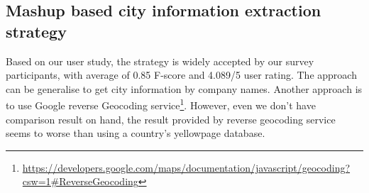 \subsection{Mashup based city information extraction strategy}

Based on our user study, the strategy is widely accepted by our survey participants, with average of 0.85 F-score and 4.089/5 user rating. The approach can be generalise to get city information by company names. Another approach is to use Google reverse Geocoding service\footnote{\url{https://developers.google.com/maps/documentation/javascript/geocoding?csw=1\#ReverseGeocoding}}. However, even we don't have comparison result on hand, the result provided by reverse geocoding service seems to worse than using a country's yellowpage database.